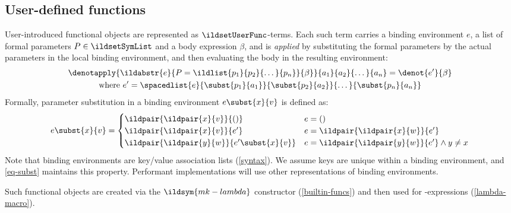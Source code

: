\subsection{User-defined functions}
\label{abstraction}
User-introduced functional objects are
represented as \(\ildsetUserFunc\)-terms. Each such term carries a binding environment \(e\),
a list of formal parameters \(P \in \ildsetSymList\) and a body expression
\(\beta\), and is \emph{applied} by substituting the formal parameters by the
actual parameters in the local binding environment,
and then evaluating the body in the resulting environment:
\begin{equation}\begin{gathered}
  \denotapply{\ildabstr{e}{P = \ildlist{p_1}{p_2}{\dots}{p_n}}{\beta}}{a_1}{a_2}{\dots}{a_n} = \denot{e'}{\beta}
  \\
  \text{where } e' = \spacedlist{e}{\subst{p_1}{a_1}}{\subst{p_2}{a_2}}{\dots}{\subst{p_n}{a_n}}
\end{gathered}\end{equation}
Formally, parameter substitution in a binding environment \(e\subst{x}{v}\) is defined as:
\begin{equation}\label{eq-subst}
  e \subst{x}{v} =
  \begin{cases}
    \ildpair{\ildpair{x}{v}}{()} & e = () \\
    \ildpair{\ildpair{x}{v}}{e'} & e = \ildpair{\ildpair{x}{w}}{e'} \\
    \ildpair{\ildpair{y}{w}}{e' \subst{x}{v}} & e = \ildpair{\ildpair{y}{w}}{e'} \land y \neq x
  \end{cases}
\end{equation}
Note that binding environments are key/value association lists
(\cref{syntax}). We assume keys are unique within a binding environment,
and \cref{eq-subst} maintains this property.
Performant implementations will use
other representations of binding environments.

Such functional objects are created via the \(\ildsym{mk-lambda}\) constructor (\cref{builtin-funcs})
and then used for -expressions (\cref{lambda-macro}).
